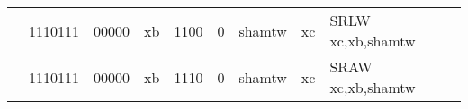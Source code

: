 \begin{table}[p]
\begin{small}
\begin{center}
\begin{tabular}{rcccccccccl}
&
\multicolumn{2}{|c|}{1110111} &
\multicolumn{1}{c|}{00000} &
\multicolumn{1}{c|}{xb} &
\multicolumn{2}{c|}{1100} &
\multicolumn{1}{c|}{0} &
\multicolumn{1}{c|}{shamtw} &
\multicolumn{1}{c|}{xc} & SRLW xc,xb,shamtw \\
\cline{2-10}
  

&
\multicolumn{2}{|c|}{1110111} &
\multicolumn{1}{c|}{00000} &
\multicolumn{1}{c|}{xb} &
\multicolumn{2}{c|}{1110} &
\multicolumn{1}{c|}{0} &
\multicolumn{1}{c|}{shamtw} &
\multicolumn{1}{c|}{xc} & SRAW xc,xb,shamtw \\
\cline{2-10}
  

\end{tabular}
\end{center}
\end{small}

\label{instr-table}
\end{table}
  

\newpage


